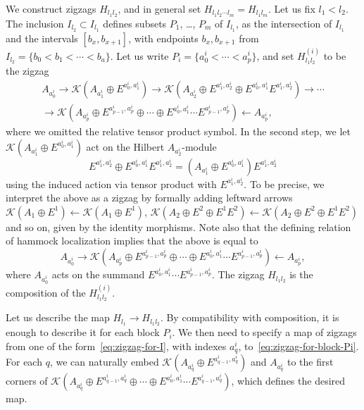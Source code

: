 \documentclass[a4paper,reqno]{amsart}
\theoremstyle{plain}
\theoremstyle{definition}
\theoremstyle{remark}
\numberwithin{equation}{section}
\newcommand{\cK}{\mathcal{K}}
\begin{document}
We construct zigzags $H_{l_1 l_2}$, and in general set $H_{l_1 l_2 \cdots l_m} = H_{l_1 l_m}$.
Let us fix $l_1 < l_2$.
The inclusion $I_{l_2} \subset I_{l_1}$ defines subsets $P_{1}$, \dots, $P_{m}$ of $I_{l_1}$, as the intersection of $I_{l_1}$ and the intervals $[b_{x}, b_{x + 1}]$, with endpoints $b_x,b_{x+1}$ from $I_{l_2} = \{ b_0 < b_1 < \cdots < b_a\}$.
Let us write $P_i = \{ a^i_0 < \cdots < a^i_p \}$, and set $H_{l_1 l_2}^{(i)}$ to be the zigzag
\begin{multline}\label{eq:zigzag-for-block-Pi}
A_{a^i_0} \to \cK(A_{a^i_1} \oplus E^{a^i_0, a^i_1}) \to \cK(A_{a^i_2} \oplus E^{a^i_1,a^i_2} \oplus E^{a^i_0,a^i_1} E^{a^i_1,a^i_2}) \to \cdots\\
\to \cK(A_{a^i_p} \oplus E^{a^i_{p-1}, a^i_p} \oplus \cdots \oplus E^{a^i_0, a^i_1} \cdots E^{a^i_{p-1}, a^i_p}) \leftarrow A_{a^i_p},
\end{multline}
where we omitted the relative tensor product symbol.
In the second step, we let $\cK(A_{a^i_1} \oplus E^{a^i_0, a^i_1})$ act on the Hilbert $A_{a^i_2}$-module
\[
E^{a^i_1,a^i_2} \oplus E^{a^i_0,a^i_1} E^{a^i_1,a^i_2} = (A_{a_1^i} \oplus E^{a_0^i, a_1^i}) E^{a^i_1,a^i_2}
\]
using the induced action via tensor product with $E^{a^i_1, a^i_2}$.
To be precise, we interpret the above as a zigzag by formally adding leftward arrows $\cK(A_1 \oplus E^1) \leftarrow \cK(A_1 \oplus E^1)$, $\cK(A_2 \oplus E^2 \oplus E^1 E^2) \leftarrow \cK(A_2 \oplus E^2 \oplus E^1 E^2)$ and so on, given by the identity morphisms.
Note also that the defining relation of hammock localization implies that the above is equal to
\begin{equation}\label{eq:zigzag-for-block-simplified}
A_{a_0^i} \to \cK(A_{a^i_p} \oplus E^{a^i_{p-1}, a^i_p} \oplus \cdots \oplus E^{a^i_0, a^i_1} \cdots E^{a^i_{p-1}, a^i_p}) \leftarrow A_{a^i_p},
\end{equation}
where $A_{a_0^i}$ acts on the summand $E^{a^i_0, a^i_1} \cdots E^{a^i_{p-1}, a^i_p}$.
The zigzag $H_{l_1 l_2}$ is the composition of the $H^{(i)}_{l_1 l_2}$.

Let us describe the map $H_{l_1} \to H_{l_1 l_2}$.
By compatibility with composition, it is enough to describe it for each block $P_i$.
We then need to specify a map of zigzags from one of the form~\eqref{eq:zigzag-for-I}, with indexes $a^i_q$, to~\eqref{eq:zigzag-for-block-Pi}.
For each $q$, we can naturally embed $\cK(A_{a^i_q} \oplus E^{a^i_{q-1}, a^i_q})$ and $A_{a^i_q}$ to the first corners of $\cK(A_{a^i_q} \oplus E^{a^i_{q-1}, a^i_q} \oplus \cdots \oplus E^{a^i_0, a^i_1} \cdots E^{a^i_{q-1}, a^i_q})$, which defines the desired map.
\end{document}
